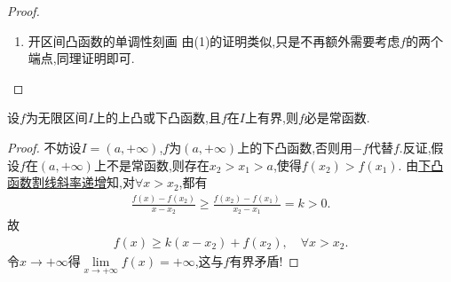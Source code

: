 \documentclass[../../main.tex]{subfiles}%
\begin{document}
\begin{proof}
\begin{enumerate}
于是再结合\eqref{proposition6.17-13.23}可知

(i)当\(\overline{f}\)的最小值\(c = b\)时，若\(f(b)>\overline{f}(b)\)，则\(f\)只在\([a,b)\)上单调递减；若\(f(b)=\overline{f}(b)\)，则\(f\)在\([a,b]\)上单调递减. 故此时无论如何，\(f\)一定在\([a,b)\)上单调递减.

(ii)当\(\overline{f}\)的最小值\(c = a\)时，若\(f(a)>\overline{f}(a)\)，则\(f\)只在\((a,b]\)上单调递增；若\(f(a)=\overline{f}(a)\)，则\(f\)在\([a,b]\)上单调递增. 故此时无论如何，\(f\)一定在\((a,b]\)上单调递增.

(iii)当\(\overline{f}\)的最小值\(c\in(a,b)\)时，\(f\)的单调性与\(\overline{f}\)相同,即\(f\)在\([c,b]\)递增,在\([a,c]\)递减.

因此结论得证.

\item {\heiti 开区间凸函数的单调性刻画}
由(1)的证明类似,只是不再额外需要考虑$f$的两个端点,同理证明即可.
\end{enumerate}

\end{proof}

\begin{proposition}[无穷区间上的有界凸函数必为常函数]\label{proposition:无穷区间上的有界凸函数必为常函数}
设$f$为无限区间$I$上的上凸或下凸函数,且$f$在$I$上有界,则$f$必是常函数.
\end{proposition}
\begin{proof}

不妨设$I=(a,+\infty)$,$f$为$(a,+\infty)$上的下凸函数,否则用$-f$代替$f$.反证,假设$f$在$(a,+\infty)$上不是常函数,则存在$x_2>x_1>a$,使得$f(x_2) >f(x_1)$.
由\hyperref[proposition:下凸函数的基本性质]{下凸函数割线斜率递增}知,对$\forall x>x_2$,都有
\begin{align*}
\frac{f(x) -f(x_2)}{x-x_2}\geqslant \frac{f(x_2) -f(x_1)}{x_2-x_1}=k>0.
\end{align*}
故
\begin{align*}
f(x) \geqslant k(x-x_2) +f(x_2),\quad \forall x>x_2.
\end{align*}
令$x\rightarrow +\infty$得$\lim\limits_{x\rightarrow +\infty}f(x) =+\infty$,这与$f$有界矛盾!

\end{proof}
\end{document}
